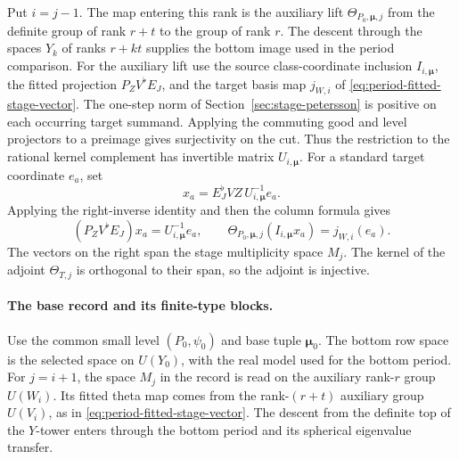 Put \(i=j-1\). The map entering this rank is the auxiliary lift
\(\Theta_{P_0,\boldsymbol\mu,j}\) from the definite group of rank \(r+t\) to
the group of rank \(r\). The descent through the spaces \(Y_k\)
of ranks \(r+kt\) supplies the bottom image used in the period
comparison. For the auxiliary lift use the source class-coordinate
inclusion \(I_{i,\boldsymbol\mu}\), the fitted projection \(P_ZV^\flat E_J\),
and the target basis map \(j_{W,i}\) of
\eqref{eq:period-fitted-stage-vector}. The one-step norm of
Section~\ref{sec:stage-petersson} is positive on each occurring
target summand. Applying the commuting good and level projectors
to a preimage gives surjectivity on the cut. Thus the restriction
to the rational kernel complement has invertible matrix
\(U_{i,\boldsymbol\mu}\). For a standard target coordinate \(e_a\), set
\[
 x_a=E_J^\flat VZ\,U_{i,\boldsymbol\mu}^{-1}e_a.
\]
Applying the right-inverse identity and then the column formula gives
\[
  (P_ZV^\flat E_J)x_a=U_{i,\boldsymbol\mu}^{-1}e_a,\qquad
  \Theta_{P_0,\boldsymbol\mu,j}(I_{i,\boldsymbol\mu}x_a)=j_{W,i}(e_a).
\]
The vectors on the right span the stage multiplicity space \(M_j\).
The kernel of the adjoint \(\Theta_{T,j}\) is orthogonal to their
span, so the adjoint is injective.

\paragraph{The base record and its finite-type blocks.}
%
Use the common small level \((P_0,\psi_0)\) and base tuple
\(\boldsymbol\mu_0\). The bottom row space is the selected space on
\(U(Y_0)\), with the real model used for the bottom period. For
\(j=i+1\), the space \(M_j\) in the record is read on the auxiliary
rank-\(r\) group \(U(W_i)\). Its fitted theta map comes from the
rank-\((r+t)\) auxiliary group \(U(V_i)\), as in
\eqref{eq:period-fitted-stage-vector}. The descent from the definite
top of the \(Y\)-tower enters through the bottom period and its
spherical eigenvalue transfer.


